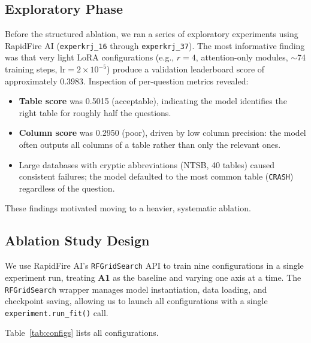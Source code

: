 \documentclass[11pt,letterpaper]{article}
\begin{document}
\subsection{Exploratory Phase}

Before the structured ablation, we ran a series of exploratory experiments
using RapidFire AI (\texttt{experkrj\_16} through \texttt{experkrj\_37}).
The most informative finding was that very light LoRA configurations
(e.g., $r=4$, attention-only modules, ${\sim}$74 training steps,
$\text{lr}=2\times10^{-5}$) produce a validation leaderboard score of
approximately 0.3983.
Inspection of per-question metrics revealed:
\begin{itemize}[leftmargin=*,noitemsep]
  \item \textbf{Table score} was 0.5015 (acceptable), indicating the model
        identifies the right table for roughly half the questions.
  \item \textbf{Column score} was 0.2950 (poor), driven by low column
        precision: the model often outputs all columns of a table rather than
        only the relevant ones.
  \item Large databases with cryptic abbreviations (NTSB, 40 tables) caused
        consistent failures; the model defaulted to the most common table
        (\texttt{CRASH}) regardless of the question.
\end{itemize}

These findings motivated moving to a heavier, systematic ablation.

\subsection{Ablation Study Design}

We use RapidFire AI's \texttt{RFGridSearch} API to train nine configurations
in a single experiment run, treating \textbf{A1} as the baseline and varying
one axis at a time.
The \texttt{RFGridSearch} wrapper manages model instantiation, data loading,
and checkpoint saving, allowing us to launch all configurations with a single
\texttt{experiment.run\_fit()} call.

Table~\ref{tab:configs} lists all configurations.
\end{document}
